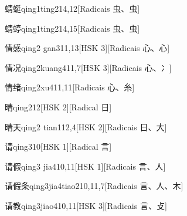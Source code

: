 \begin{entry}{蜻蜓}{qing1ting2}{14,12}[Radicais ⾍、⾍]
\end{entry}

\begin{entry}{蜻蝏}{qing1ting2}{14,15}[Radicais ⾍、⾍]
\end{entry}

\begin{entry}{情感}{qing2 gan3}{11,13}[HSK 3][Radicais ⼼、⼼]
\end{entry}

\begin{entry}{情况}{qing2kuang4}{11,7}[HSK 3][Radicais ⼼、⼎]
\end{entry}

\begin{entry}{情绪}{qing2xu4}{11,11}[Radicais ⼼、⽷]
\end{entry}

\begin{entry}{晴}{qing2}{12}[HSK 2][Radical ⽇]
\end{entry}

\begin{entry}{晴天}{qing2 tian1}{12,4}[HSK 2][Radicais ⽇、⼤]
\end{entry}

\begin{entry}{请}{qing3}{10}[HSK 1][Radical ⾔]
\end{entry}

\begin{entry}{请假}{qing3 jia4}{10,11}[HSK 1][Radicais ⾔、⼈]
\end{entry}

\begin{entry}{请假条}{qing3jia4tiao2}{10,11,7}[Radicais ⾔、⼈、⽊]
\end{entry}

\begin{entry}{请教}{qing3jiao4}{10,11}[HSK 3][Radicais ⾔、⽁]
\end{entry}

